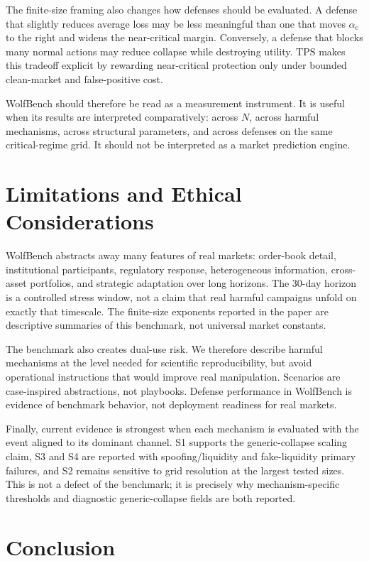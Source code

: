 \documentclass[letterpaper]{article} %
\newcommand{\alphac}{\alpha_{\mathrm{c}}}
\newcommand{\tps}{\mathrm{TPS}}
\begin{document}
The finite-size framing also changes how defenses should be evaluated. A
defense that slightly reduces average loss may be less meaningful than one that
moves \(\alphac\) to the right and widens the near-critical margin. Conversely,
a defense that blocks many normal actions may reduce collapse while destroying
utility. \(\tps\) makes this tradeoff explicit by rewarding near-critical
protection only under bounded clean-market and false-positive cost.

WolfBench should therefore be read as a measurement instrument. It is useful
when its results are interpreted comparatively: across \(N\), across harmful
mechanisms, across structural parameters, and across defenses on the same
critical-regime grid. It should not be interpreted as a market prediction
engine.

\section{Limitations and Ethical Considerations}

WolfBench abstracts away many features of real markets: order-book detail,
institutional participants, regulatory response, heterogeneous information,
cross-asset portfolios, and strategic adaptation over long horizons. The
30-day horizon is a controlled stress window, not a claim that real harmful
campaigns unfold on exactly that timescale. The finite-size exponents reported
in the paper are descriptive summaries of this benchmark, not universal market
constants.

The benchmark also creates dual-use risk. We therefore describe harmful
mechanisms at the level needed for scientific reproducibility, but avoid
operational instructions that would improve real manipulation. Scenarios are
case-inspired abstractions, not playbooks. Defense performance in WolfBench is
evidence of benchmark behavior, not deployment readiness for real markets.

Finally, current evidence is strongest when each mechanism is evaluated with
the event aligned to its dominant channel. S1 supports the generic-collapse
scaling claim, S3 and S4 are reported with spoofing/liquidity and
fake-liquidity primary failures, and S2 remains sensitive to grid resolution at
the largest tested sizes. This is not a defect of the benchmark; it is
precisely why mechanism-specific thresholds and diagnostic generic-collapse
fields are both reported.

\section{Conclusion}
\end{document}
